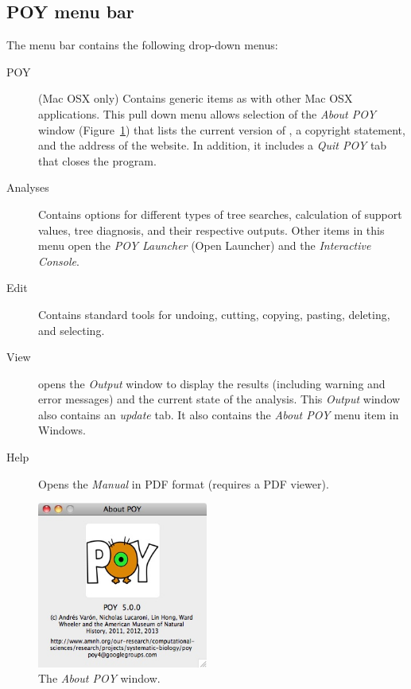 \subsection{POY menu bar}
The menu bar contains the following drop-down menus:
\begin{description}
\item[POY] (Mac OSX only) Contains generic items as with other 
Mac OSX applications. This pull down menu allows selection of the 
\emph{About POY} window (Figure~\ref{fig:about_window}) that 
lists the current version of \poy, a copyright statement, and the address 
of the \poy website. In addition, it includes a \emph{Quit POY} tab 
that closes the program. 
\item[Analyses]    Contains options for different types of tree searches, 
calculation of support values, tree diagnosis, and their respective outputs. 
Other items in this menu open the \emph{POY Launcher} 
(Open Launcher) and the \emph{Interactive Console}.
\item[Edit] Contains standard tools for undoing, cutting, copying, 
pasting, deleting, and selecting.
\item[View] opens the \emph{Output} window to display the results 
(including warning and error messages) and the current state of the analysis. 
This \emph{Output} window also contains an \emph{update} tab.  
It also contains the \emph{About POY} menu item in Windows. %
\item[Help] Opens the \poy \emph{Manual} in PDF format (requires 
a PDF viewer).
\end{description}

\begin{figure}[htpb]
\begin{center}
\includegraphics[width=0.5\textwidth]{doc/figures/about_window.jpg}
\end{center}
\caption{The \emph{About POY} window.}
\label{fig:about_window}

\end{figure}

